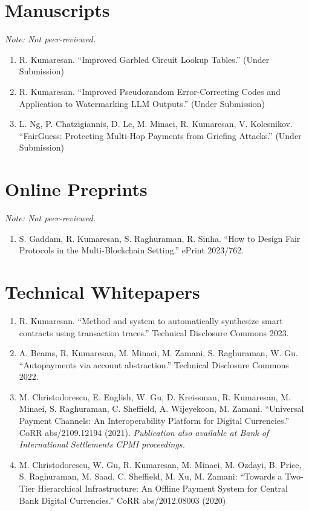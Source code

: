 \documentclass[11pt]{article}
\begin{document}
\section{Manuscripts}
\textit{Note: Not peer-reviewed.}
\begin{enumerate}[leftmargin=*, itemsep=1pt]
    \item R. Kumaresan. ``Improved Garbled Circuit Lookup Tables.'' (Under Submission)
    
    \item R. Kumaresan. ``Improved Pseudorandom Error-Correcting Codes and Application to Watermarking LLM Outputs.'' (Under Submission)
    
    \item L. Ng, P. Chatzigiannis, D. Le, M. Minaei, R. Kumaresan, V. Kolesnikov. ``FairGuess: Protecting Multi-Hop Payments from Griefing Attacks.'' (Under Submission)
\end{enumerate}

\section{Online Preprints}
\textit{Note: Not peer-reviewed.}
\begin{enumerate}[leftmargin=*, itemsep=1pt]
    \item S. Gaddam, R. Kumaresan, S. Raghuraman, R. Sinha. ``How to Design Fair Protocols in the Multi-Blockchain Setting.'' ePrint 2023/762.
\end{enumerate}

\section{Technical Whitepapers}
\begin{enumerate}[leftmargin=*, itemsep=1pt]
    \item R. Kumaresan. ``Method and system to automatically synthesize smart contracts using transaction traces.'' Technical Disclosure Commons 2023.
    
    \item A. Beams, R. Kumaresan, M. Minaei, M. Zamani, S. Raghuraman, W. Gu. ``Autopayments via account abstraction.'' Technical Disclosure Commons 2022.
    
    \item M. Christodorescu, E. English, W. Gu, D. Kreissman, R. Kumaresan, M. Minaei, S. Raghuraman, C. Sheffield, A. Wijeyekoon, M. Zamani. ``Universal Payment Channels: An Interoperability Platform for Digital Currencies.'' CoRR abs/2109.12194 (2021). \textit{Publication also available at Bank of International Settlements CPMI proceedings.}
    
    \item M. Christodorescu, W. Gu, R. Kumaresan, M. Minaei, M. Ozdayi, B. Price, S. Raghuraman, M. Saad, C. Sheffield, M. Xu, M. Zamani: ``Towards a Two-Tier Hierarchical Infrastructure: An Offline Payment System for Central Bank Digital Currencies.'' CoRR abs/2012.08003 (2020)
\end{enumerate}
\end{document}
